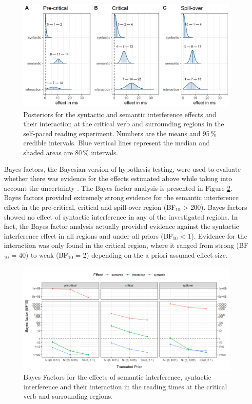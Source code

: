 \documentclass[a4paper, man, floatsintext]{apa7}
\begin{document}
\begin{figure}[H]
    \caption{Posteriors for the syntactic and semantic interference effects and their interaction at the critical verb and surrounding regions in the self-paced reading experiment. Numbers are the means and 95\,\% credible intervals. Blue vertical lines represent the median and shaded areas are 80\,\% intervals.}
    \label{fig:spr_posteriors}
    \centering
    \includegraphics[width=\textwidth]{images/posteriors_spr_pooled_774.png}
\end{figure}

Bayes factors, the Bayesian version of hypothesis testing, were used to evaluate whether there was evidence for the effects estimated above while taking into account the uncertainty \citep{schad_etal_2022_BF}. The Bayes factor analysis is presented in Figure \ref{fig:spr_bfs}. Bayes factors provided extremely strong evidence for the semantic interference effect in the pre-critical, critical and spill-over region (BF$_{10}$ > 200). Bayes factors showed no effect of syntactic interference in any of the investigated regions. In fact, the Bayes factor analysis actually provided evidence against the syntactic interference effect in all regions and under all priors (BF$_{10}$ < 1).  Evidence for the interaction was only found in the critical region, where it ranged from strong (BF$_{10}$ = 40) to weak (BF$_{10}$ = 2) depending on the a priori assumed effect size.

\begin{figure}[H]
    \caption{Bayes Factors for the effects of semantic interference, syntactic interference and their interaction in the reading times at the critical verb and surrounding regions.}
    \label{fig:spr_bfs}
    \centering
    \includegraphics[width=\textwidth]{images/BF_plot_spr_774_allregions.png}
\end{figure}
\end{document}
